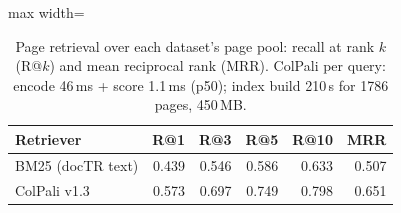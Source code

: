 \begin{table}[t]
\centering
\caption{Page retrieval over each dataset's page pool: recall at rank $k$ (R@$k$) and mean reciprocal rank (MRR). ColPali per query: encode 46\,ms + score 1.1\,ms (p50); index build 210\,s for 1786 pages, 450\,MB.}
\label{tab:retrieval}
\begin{adjustbox}{max width=\linewidth}
\begin{tabular}{lrrrrr}
\toprule
\textbf{Retriever} & \textbf{R@1} & \textbf{R@3} & \textbf{R@5} & \textbf{R@10} & \textbf{MRR} \\
\midrule
BM25 (docTR text) & 0.439 & 0.546 & 0.586 & 0.633 & 0.507 \\
ColPali v1.3 & 0.573 & 0.697 & 0.749 & 0.798 & 0.651 \\
\bottomrule
\end{tabular}
\end{adjustbox}
\end{table}
